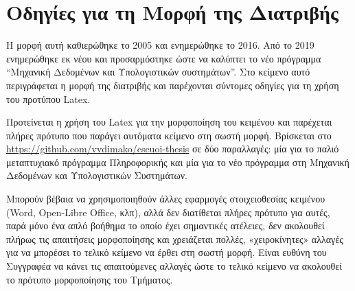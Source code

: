 \chapter{Οδηγίες για τη Μορφή της Διατριβής}
\label{ch:Instructions}

Η μορφή αυτή καθιερώθηκε το 2005 και ενημερώθηκε το 2016. 
Από το 2019 ενημερώθηκε εκ νέου και προσαρμόστηκε ώστε να καλύπτει το νέο 
πρόγραμμα ``Μηχανική Δεδομένων και Υπολογιστικών συστημάτων''.
Στο κείμενο αυτό περιγράφεται η μορφή της διατριβής και παρέχονται σύντομες οδηγίες για τη χρήση του προτύπου Latex.

Προτείνεται η χρήση του Latex για την μορφοποίηση του κειμένου και παρέχεται πλήρες πρότυπο που παράγει αυτόματα κείμενο στη σωστή μορφή.
Βρίσκεται στο \url{https://github.com/vvdimako/cseuoi-thesis} σε δύο παραλλαγές: μία για το παλιό μεταπτυχιακό πρόγραμμα Πληροφορικής και μία για το νέο πρόγραμμα στη Μηχανική Δεδομένων και Υπολογιστικών Συστημάτων.

Μπορούν βέβαια να χρησιμοποιηθούν άλλες εφαρμογές στοιχειοθεσίας κειμένου (Word, Open-Libre Office, κλπ), αλλά δεν διατίθεται πλήρες πρότυπο για αυτές, παρά μόνο ένα απλό βοήθημα το οποίο έχει σημαντικές ατέλειες, δεν ακολουθεί πλήρως τις απαιτήσεις μορφοποίησης και χρειάζεται πολλές, «χειροκίνητες» αλλαγές για να μπορέσει το τελικό κείμενο να έρθει στη σωστή μορφή.
Είναι ευθύνη του Συγγραφέα να κάνει τις απαιτούμενες αλλαγές ώστε το τελικό κείμενο να ακολουθεί το πρότυπο μορφοποίησης του Τμήματος. 


